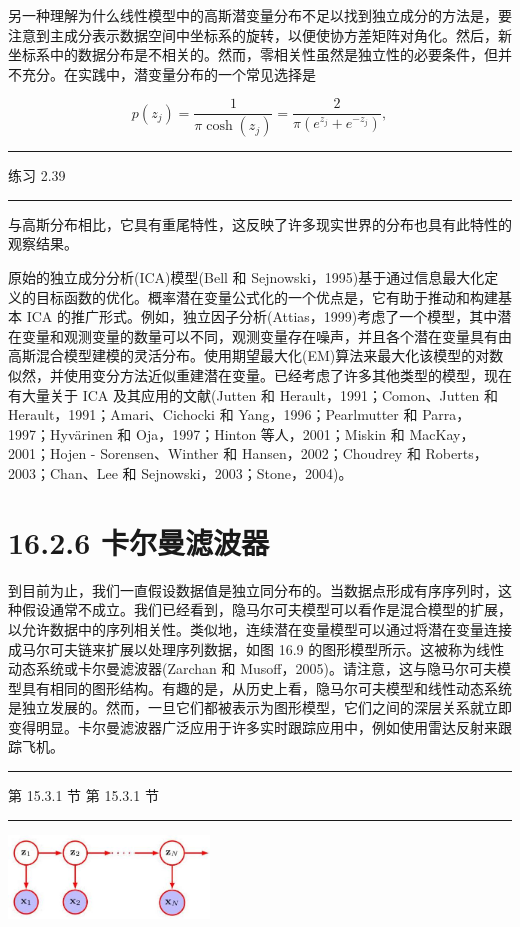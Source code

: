 \documentclass[10pt]{article}
\newcommand{\HRule}{\begin{center}\rule{0.9\linewidth}{0.2mm}\end{center}}
\begin{document}
另一种理解为什么线性模型中的高斯潜变量分布不足以找到独立成分的方法是，要注意到主成分表示数据空间中坐标系的旋转，以便使协方差矩阵对角化。然后，新坐标系中的数据分布是不相关的。然而，零相关性虽然是独立性的必要条件，但并不充分。在实践中，潜变量分布的一个常见选择是

\[
p\left( {z}_{j}\right)  = \frac{1}{\pi \cosh \left( {z}_{j}\right) } = \frac{2}{\pi \left( {{e}^{{z}_{j}} + {e}^{-{z}_{j}}}\right) }, \tag{16.56}
\]

\HRule

练习 2.39

\HRule

与高斯分布相比，它具有重尾特性，这反映了许多现实世界的分布也具有此特性的观察结果。

原始的独立成分分析(ICA)模型(Bell 和 Sejnowski，1995)基于通过信息最大化定义的目标函数的优化。概率潜在变量公式化的一个优点是，它有助于推动和构建基本 ICA 的推广形式。例如，独立因子分析(Attias，1999)考虑了一个模型，其中潜在变量和观测变量的数量可以不同，观测变量存在噪声，并且各个潜在变量具有由高斯混合模型建模的灵活分布。使用期望最大化(EM)算法来最大化该模型的对数似然，并使用变分方法近似重建潜在变量。已经考虑了许多其他类型的模型，现在有大量关于 ICA 及其应用的文献(Jutten 和 Herault，1991；Comon、Jutten 和 Herault，1991；Amari、Cichocki 和 Yang，1996；Pearlmutter 和 Parra，1997；Hyvärinen 和 Oja，1997；Hinton 等人，2001；Miskin 和 MacKay，2001；Hojen - Sorensen、Winther 和 Hansen，2002；Choudrey 和 Roberts，2003；Chan、Lee 和 Sejnowski，2003；Stone，2004)。

\section*{16.2.6 卡尔曼滤波器}

到目前为止，我们一直假设数据值是独立同分布的。当数据点形成有序序列时，这种假设通常不成立。我们已经看到，隐马尔可夫模型可以看作是混合模型的扩展，以允许数据中的序列相关性。类似地，连续潜在变量模型可以通过将潜在变量连接成马尔可夫链来扩展以处理序列数据，如图 16.9 的图形模型所示。这被称为线性动态系统或卡尔曼滤波器(Zarchan 和 Musoff，2005)。请注意，这与隐马尔可夫模型具有相同的图形结构。有趣的是，从历史上看，隐马尔可夫模型和线性动态系统是独立发展的。然而，一旦它们都被表示为图形模型，它们之间的深层关系就立即变得明显。卡尔曼滤波器广泛应用于许多实时跟踪应用中，例如使用雷达反射来跟踪飞机。

\HRule

第 15.3.1 节 第 15.3.1 节

\HRule

\begin{center}
\includegraphics[max width=0.4\textwidth]{images/0194e279-9b28-703a-88f4-c3ac21e2010d_535_1013_343_535_223_0.jpg}
\end{center}
\hspace*{3em} 
\end{document}

